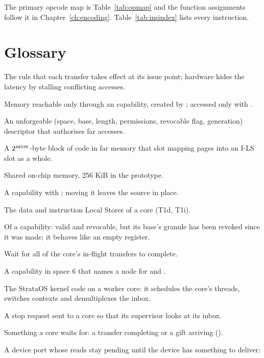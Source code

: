 The primary opcode map is Table~\ref{tab:opmap} and the function assignments follow it in
Chapter~\ref{ch:encoding}. Table~\ref{tab:insindex} lists every instruction.



\chapter{Glossary}\label{app:glossary}

\begin{description}[leftmargin=1em,style=nextline]
\item[As-if-synchronous] The rule that each transfer takes effect at its issue point; hardware hides the
  latency by stalling conflicting accesses.
\item[Atomic segment] Memory reachable only through an  capability, created by ;
  accessed only with .
\item[Capability] An unforgeable (space, base, length, permissions, revocable flag, generation) descriptor that
  authorises far accesses.
\item[Code unit] A $2^{\texttt{xslot}}$-byte block of code in far memory that slot mapping pages into an
  I-LS slot as a whole.
\item[Cluster store (T2)] Shared on-chip memory, 256 KiB in the prototype.
\item[Copyable] A capability with ; moving it leaves the source in place.
\item[D-LS, I-LS] The data and instruction Local Stores of a core (T1d, T1i).
\item[Dead] Of a capability: valid and revocable, but its base's granule has been revoked since it
  was made; it behaves like an empty register.
\item[Drain] Wait for all of the core's in-flight transfers to complete.
\item[Endpoint] A capability in space 6 that names a node for  and .
\item[Dispatcher] The StrataOS kernel code on a worker core: it schedules the core's threads, switches
  contexts and demultiplexes the inbox.
\item[Doorbell] A stop request sent to a core so that its supervisor looks at its inbox.
\item[Event] Something a core waits for: a transfer completing or a gift arriving ().
\item[Event port] A device port whose reads stay pending until the device has something to deliver:

\end{description}
